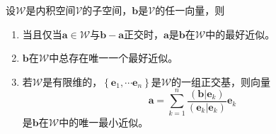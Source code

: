 \documentclass[main.tex]{subfiles}
\begin{document}
\begin{theorem}[最好近似的表示]\label{thm:A.4}
    设$\mathcal{W}$是内积空间$\mathcal{V}$的子空间，$\mathbf{b}$是$\mathcal{V}$的任一向量，则
    \begin{enumerate}
        \item 当且仅当$\mathbf{a}\in\mathcal{W}$与$\mathbf{b}-\mathbf{a}$正交时，$\mathbf{a}$是$\mathbf{b}$在$\mathcal{W}$中的最好近似。
        \item $\mathbf{b}$在$\mathcal{W}$中总存在唯一一个最好近似。
        \item 若$\mathcal{W}$是有限维的，$\left\{\mathbf{e}_1,\cdots\mathbf{e}_n\right\}$是$\mathcal{W}$的一组正交基，则向量
              \[\mathbf{a}=\sum_{k=1}^n\frac{\left(\mathbf{b}|\mathbf{e}_k\right)}{\left(\mathbf{e}_k|\mathbf{e}_k\right)}\mathbf{e}_k\]
              是$\mathbf{b}$在$\mathcal{W}$中的唯一最小近似。
    \end{enumerate}
\end{theorem}
\end{document}
